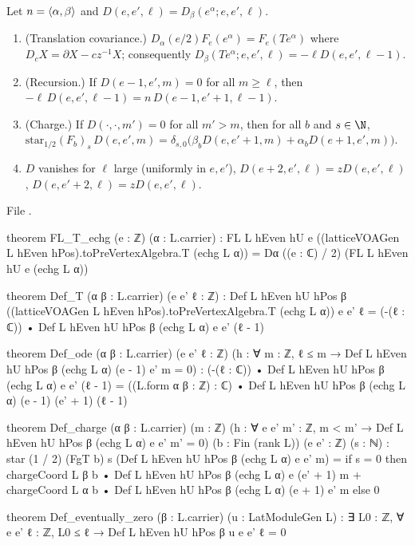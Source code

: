 \begin{proposition}\label{ch08:prop:Def}
Let $n=\langle \alpha,\beta\rangle$ and $D(e,e',\ell)=D_\beta(e^\alpha;e,e',\ell)$.
\begin{enumerate}
\item (Translation covariance.) $D_\alpha(e/2)F_e(e^\alpha)=F_e(Te^\alpha)$ where
  $D_c X=\partial X-cz^{-1}X$; consequently $D_\beta(Te^\alpha;e,e',\ell)=-\ell D(e,e',\ell-1)$.
\item (Recursion.) If $D(e-1,e',m)=0$ for all $m\ge\ell$, then
  $-\ell\,D(e,e',\ell-1)=n\,D(e-1,e'+1,\ell-1)$.
\item (Charge.) If $D(\cdot,\cdot,m')=0$ for all $m'>m$, then for all $b$ and $s\in\N$,
  $\mathrm{star}_{1/2}(F_b)_s\,D(e,e',m)=\delta_{s,0}\bigl(\beta_bD(e,e'+1,m)+\alpha_bD(e+1,e',m)\bigr)$.
\item $D$ vanishes for $\ell$ large (uniformly in $e,e'$), $D(e+2,e',\ell)=zD(e,e',\ell)$,
  $D(e,e'+2,\ell)=zD(e,e',\ell)$.
\end{enumerate}
\end{proposition}
\noindent File .
\begin{leancode}
theorem FL_T_echg (e : ℤ) (α : L.carrier) :
    FL L hEven hU e ((latticeVOAGen L hEven hPos).toPreVertexAlgebra.T (echg L α))
      = Dα ((e : ℂ) / 2) (FL L hEven hU e (echg L α))

theorem Def_T (α β : L.carrier) (e e' ℓ : ℤ) :
    Def L hEven hU hPos β ((latticeVOAGen L hEven hPos).toPreVertexAlgebra.T (echg L α)) e e' ℓ
      = (-(ℓ : ℂ)) • Def L hEven hU hPos β (echg L α) e e' (ℓ - 1)

theorem Def_ode (α β : L.carrier) (e e' ℓ : ℤ)
    (h : ∀ m : ℤ, ℓ ≤ m → Def L hEven hU hPos β (echg L α) (e - 1) e' m = 0) :
    (-(ℓ : ℂ)) • Def L hEven hU hPos β (echg L α) e e' (ℓ - 1)
      = ((L.form α β : ℤ) : ℂ) • Def L hEven hU hPos β (echg L α) (e - 1) (e' + 1) (ℓ - 1)

theorem Def_charge (α β : L.carrier) (m : ℤ)
    (h : ∀ e e' m' : ℤ, m < m' → Def L hEven hU hPos β (echg L α) e e' m' = 0)
    (b : Fin (rank L)) (e e' : ℤ) (s : ℕ) :
    star (1 / 2) (FgT b) s (Def L hEven hU hPos β (echg L α) e e' m)
      = if s = 0 then chargeCoord L β b • Def L hEven hU hPos β (echg L α) e (e' + 1) m
          + chargeCoord L α b • Def L hEven hU hPos β (echg L α) (e + 1) e' m else 0

theorem Def_eventually_zero (β : L.carrier) (u : LatModuleGen L) :
    ∃ L0 : ℤ, ∀ e e' ℓ : ℤ, L0 ≤ ℓ → Def L hEven hU hPos β u e e' ℓ = 0
\end{leancode}
